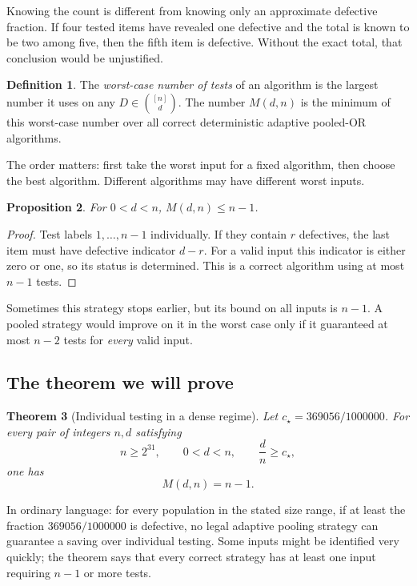 \documentclass[11pt]{article}
\newtheorem{theorem}{Theorem}[section]
\newtheorem{proposition}[theorem]{Proposition}
\theoremstyle{definition}
\newtheorem{definition}[theorem]{Definition}
\theoremstyle{remark}
\newcommand{\cstar}{c_\star}
\numberwithin{equation}{section}
\begin{document}
Knowing the count is different from knowing only an approximate
defective fraction. If four tested items have revealed one defective
and the total is known to be two among five, then the fifth item is
defective. Without the exact total, that conclusion would be unjustified.

\begin{definition}
The \emph{worst-case number of tests} of an algorithm is the largest
number it uses on any \(D\in\binom{[n]}d\).
The number \(M(d,n)\) is the minimum of this worst-case number over
all correct deterministic adaptive pooled-\(\mathrm{OR}\) algorithms.
\end{definition}

The order matters: first take the worst input for a fixed algorithm,
then choose the best algorithm. Different algorithms may have
different worst inputs.

\begin{proposition}\label{prop:individual}
For \(0<d<n\), \(M(d,n)\le n-1\).
\end{proposition}
\begin{proof}
Test labels \(1,\ldots,n-1\) individually. If they contain \(r\)
defectives, the last item must have defective indicator \(d-r\).
For a valid input this indicator is either zero or one, so its
status is determined. This is a correct algorithm using at most
\(n-1\) tests.
\end{proof}

Sometimes this strategy stops earlier, but its bound on all inputs
is \(n-1\). A pooled strategy would improve on it in the worst case
only if it guaranteed at most \(n-2\) tests for \emph{every} valid input.

\subsection{The theorem we will prove}

\begin{theorem}[Individual testing in a dense regime]\label{thm:main}
Let \(\cstar=369056/1000000\). For every pair of integers \(n,d\)
satisfying
\[
 n\ge2^{31},\qquad 0<d<n,\qquad \frac dn\ge\cstar,
\]
one has
\[
 \boxed{M(d,n)=n-1.}
\]
\end{theorem}

In ordinary language: for every population in the stated size range,
if at least the fraction \(369056/1000000\) is defective, no legal
adaptive pooling strategy can guarantee a saving over individual
testing. Some inputs might be identified very quickly; the theorem
says that every correct strategy has at least one input requiring
\(n-1\) or more tests.
\end{document}
